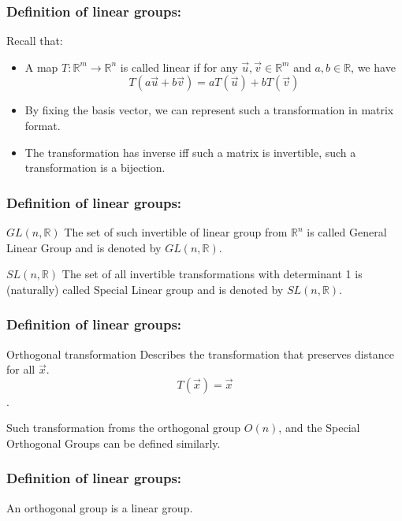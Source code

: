 \documentclass{beamer}
\begin{document}

\begin{frame}
\frametitle{Definition of linear groups:}
Recall that: \begin{itemize}
\item<1-> A map $T: \mathbb{R}^m \rightarrow \mathbb{R}^n $ is called linear if for any $\vec{u}, \vec{v} \in \mathbb{R}^m$ and $a,b \in \mathbb{R}$, we have $$T(a\vec{u}+b\vec{v}) = aT(\vec{u})+bT(\vec{v})$$
\item<2-> By fixing the basis vector, we can represent such a transformation in matrix format.
\item<3-> The transformation has inverse iff such a matrix is invertible, such a transformation is a \alert{bijection}.
\end{itemize}
\end{frame}

\begin{frame}
\frametitle{Definition of linear groups:}
\begin{block}{$GL(n, \mathbb{R})$} The set of such invertible of linear group from $\mathbb{R}^n$ is called \alert{General Linear Group} and is denoted by $GL(n,\mathbb{R})$.
\end{block}
\begin{block}{$SL(n, \mathbb{R})$} The set of all invertible transformations with determinant 1 is (naturally) called \alert{Special Linear group} and is denoted by $SL(n, \mathbb{R})$.
\end{block}
\end{frame}

\begin{frame}
\frametitle{Definition of linear groups:}
\begin{block}{Orthogonal transformation}
Describes the transformation that preserves distance for all $\vec{x}$. $$T(\vec{x}) = \vec{x}$$.
\end{block}
Such transformation froms the orthogonal group $O(n)$, and the Special Orthogonal Groups can be defined similarly.
\end{frame}

\begin{frame}
\frametitle{Definition of linear groups:}
An orthogonal group is a linear group.
\end{frame}


\end{document}
